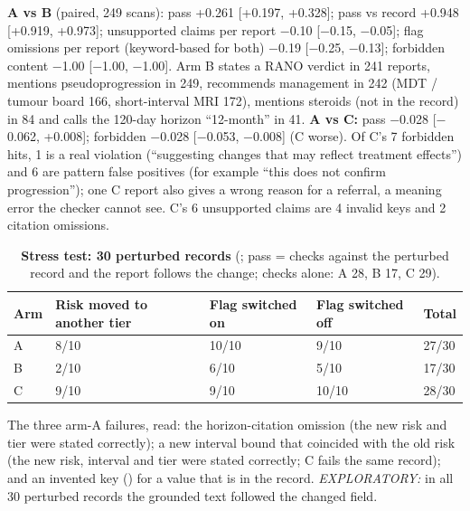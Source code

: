 \documentclass[11pt,a4paper]{article}
\begin{document}
\textbf{A vs B} (paired, 249 scans): pass +0.261 [+0.197, +0.328]; pass vs record +0.948 [+0.919, +0.973];
unsupported claims per report $-$0.10 [$-$0.15, $-$0.05]; flag omissions per report (keyword-based for both)
$-$0.19 [$-$0.25, $-$0.13]; forbidden content $-$1.00 [$-$1.00, $-$1.00]. Arm B states a RANO verdict in 241 reports,
mentions pseudoprogression in 249, recommends management in 242 (MDT / tumour board 166, short-interval MRI 172),
mentions steroids (not in the record) in 84 and calls the 120-day horizon ``12-month'' in 41. \textbf{A vs C:} pass
$-$0.028 [$-$0.062, +0.008]; forbidden $-$0.028 [$-$0.053, $-$0.008] (C worse). Of C's 7 forbidden hits, 1 is a real
violation (``suggesting changes that may reflect treatment effects'') and 6 are pattern false positives (for example
``this does not confirm progression''); one C report also gives a wrong reason for a referral, a meaning error the
checker cannot see. C's 6 unsupported claims are 4 invalid keys and 2 citation omissions.

\begin{table}[H]
\centering
\small
\renewcommand{\thetable}{S27}\renewcommand{\theHtable}{S27}
\caption{\textbf{Stress test: 30 perturbed records} (; pass = checks against the perturbed record and
the report follows the change; checks alone: A 28, B 17, C 29).}
\label{tab:S27}
\begin{tabularx}{\linewidth}{@{}L R{2.6cm} R{2.4cm} R{2.4cm} R{1.4cm}@{}}
\toprule
Arm & Risk moved to another tier & Flag switched on & Flag switched off & Total \\
\midrule
A & 8/10 & 10/10 & 9/10 & 27/30 \\
B & 2/10 & 6/10 & 5/10 & 17/30 \\
C & 9/10 & 9/10 & 10/10 & 28/30 \\
\bottomrule
\end{tabularx}
\end{table}

The three arm-A failures, read: the horizon-citation omission (the new risk and tier were stated correctly); a new
interval bound that coincided with the old risk (the new risk, interval and tier were stated correctly; C fails
the same record); and an invented key () for a value that is in the record.
\emph{EXPLORATORY:} in all 30 perturbed records the grounded text followed the changed field.
\end{document}
